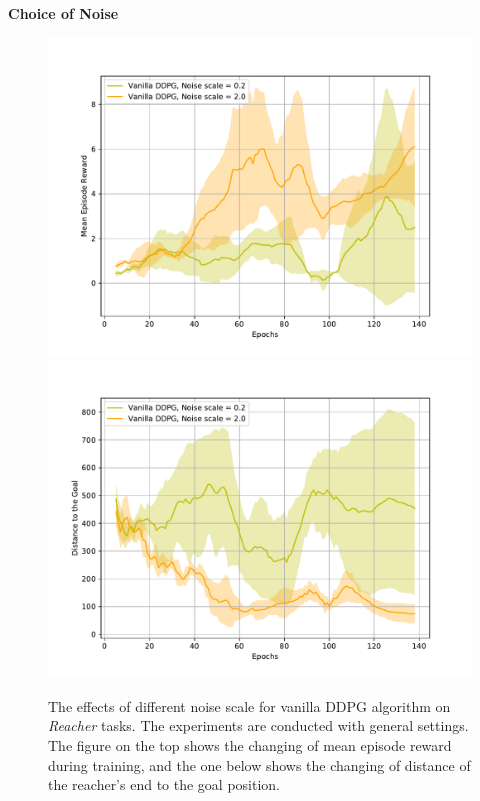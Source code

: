\documentclass{article}
\begin{document}
\textbf{Choice of Noise}

\begin{figure}[htbp]
	\centering
	\includegraphics[scale=0.5]{img/3000step1.pdf}
	\includegraphics[scale=0.5]{img/3000step2.pdf}
	\caption{The effects of different noise scale for vanilla DDPG algorithm on \textit{Reacher} tasks. The experiments are conducted with general settings. The figure on the top shows the changing of mean episode reward during training, and the one below shows the changing of distance of the reacher's end to the goal position. }
	\label{fig:noise0}
\end{figure}
\end{document}
